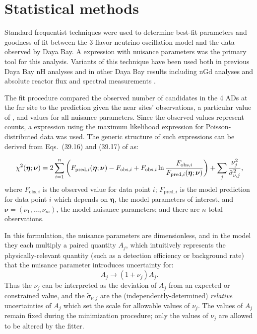 \section{Statistical methods}
\label{sec:fitter}

Standard frequentist techniques were used to determine best-fit parameters
and goodness-of-fit between the 3-flavor neutrino oscillation model
and the data observed by Daya Bay.
A \chisquare{} expression with nuisance parameters
was the primary tool for this analysis.
Variants of this technique have been used both in previous Daya Bay nH analyses
and in other Daya Bay results including nGd \thetaot{} analyses
and absolute reactor \nuebar{} flux and spectral measurements
\cite{nh2016,ngd2016,reactorflux2017,extractionreactorflux2019}.

The fit procedure compared the observed number of \nuebar{} candidates
in the 4 ADs at the far site to the prediction
given the near sites' observations, a particular value of \thetaot{},
and values for all nuisance parameters.
Since the observed values represent counts,
a \chisquare{} expression using the maximum likelihood expression
for Poisson-distributed data was used.
The generic structure of such \chisquare{} expressions
can be derived from Eqs.~(39.16) and (39.17) of \cite{pdg} as:

\begin{equation}
    \label{eq:chisquare_generic}
    \chi^2(\boldsymbol{\eta};\boldsymbol{\nu}) = 2\sum_{i=1}^{n} \left(
        F_{\text{pred},i}(\boldsymbol{\eta};\boldsymbol{\nu}) - F_{\text{obs},i}
        + F_{\text{obs},i}\ln
        \frac{F_{\text{obs},i}}{F_{\text{pred},i}(\boldsymbol{\eta};\boldsymbol{\nu})}
        \right)
        +
        \sum_j \frac{\nu_j^2}{\tilde{\sigma}_{\nu,j}^2},
\end{equation}
where $F_{\text{obs},i}$ is the observed value for data point $i$;
$F_{\text{pred},i}$
is the model prediction for data point $i$
which depends on $\boldsymbol{\eta}$, the model parameters of interest,
and $\boldsymbol{\nu}=(\nu_1, \ldots, \nu_m)$,
the model nuisance parameters;
and there are $n$ total observations.

In this formulation, the nuisance parameters are dimensionless,
and in the model they each multiply a paired quantity $A_j$,
which intuitively represents the physically-relevant quantity
(such as a detection efficiency or background rate)
that the nuisance parameter introduces uncertainty for:
\begin{equation}
    A_j \to (1+\nu_j)A_j.
\end{equation}
Thus the $\nu_j$ can be interpreted as the deviation of $A_j$
from an expected or constrained value,
and the $\tilde{\sigma}_{\nu,j}$ are the (independently-determined)
\emph{relative} uncertainties of $A_j$
which set the scale for allowable values of $\nu_j$.
The values of $A_j$ remain fixed during the minimization procedure;
only the values of $\nu_j$ are allowed to be altered by the fitter.

